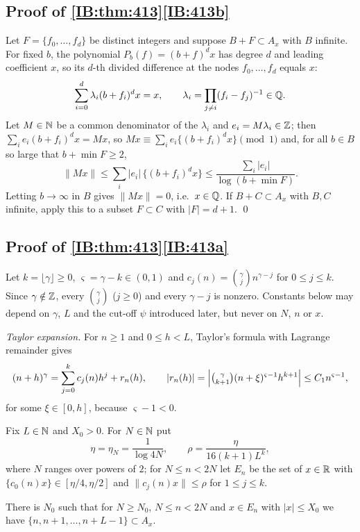 \subsection{Proof of \texorpdfstring{\cref{IB:thm:413}\ref{IB:413b}}{part (b)}}

Let $F=\{f_0,\dots,f_d\}$ be distinct integers and suppose $B+F\subset A_x$ with $B$
infinite. For fixed $b$, the polynomial $P_b(f)=(b+f)^dx$ has degree $d$ and leading
coefficient $x$, so its $d$-th divided difference at the nodes $f_0,\dots,f_d$ equals
$x$:
\[
\sum_{i=0}^d\lambda_i(b+f_i)^dx=x,\qquad \lambda_i=\prod_{j\ne i}(f_i-f_j)^{-1}\in\mathbb{Q} .
\]
Let $M\in\mathbb{N}$ be a common denominator of the $\lambda_i$ and $e_i=M\lambda_i\in\mathbb{Z}$; then
$\sum_ie_i(b+f_i)^dx=Mx$, so $Mx\equiv\sum_ie_i\{(b+f_i)^dx\}\pmod 1$ and, for all
$b\in B$ so large that $b+\min F\ge2$,
\[
\|Mx\|\le\sum_i|e_i|\,\{(b+f_i)^dx\}\le\frac{\sum_i|e_i|}{\log(b+\min F)} .
\]
Letting $b\to\infty$ in $B$ gives $\|Mx\|=0$, i.e.\ $x\in\mathbb{Q}$. If $B+C\subset A_x$ with $B,C$
infinite, apply this to a subset $F\subset C$ with $|F|=d+1$. \qed

\subsection{Proof of \texorpdfstring{\cref{IB:thm:413}\ref{IB:413a}}{part (a)}}

Let $k=\lfloor\gamma\rfloor\ge0$, $\varsigma=\gamma-k\in(0,1)$ and
$c_j(n)=\binom{\gamma}{j}n^{\gamma-j}$ for $0\le j\le k$. Since $\gamma\notin\mathbb{Z}$, every
$\binom\gamma j$ ($j\ge0$) and every $\gamma-j$ is nonzero. Constants below may depend on
$\gamma$, $L$ and the cut-off $\psi$ introduced later, but never on $N$, $n$ or $x$.

\emph{Taylor expansion.} For $n\ge1$ and $0\le h<L$, Taylor's formula with
Lagrange remainder gives
\begin{equation}\label{IB:eq:taylor}
(n+h)^\gamma=\sum_{j=0}^kc_j(n)h^j+r_n(h),\qquad
|r_n(h)|=\Bigl|\tbinom{\gamma}{k+1}(n+\xi)^{\varsigma-1}h^{k+1}\Bigr|\le C_1n^{\varsigma-1},
\end{equation}
for some $\xi\in[0,h]$, because $\varsigma-1<0$.

Fix $L\in\mathbb{N}$ and $X_0>0$. For $N\in\mathbb{N}$ put
\[
\eta=\eta_N=\frac1{\log 4N},\qquad \rho=\frac{\eta}{16(k+1)L^k},
\]
where $N$ ranges over powers of $2$; for $N\le n<2N$ let $E_n$ be the set of $x\in\mathbb{R}$ with
$\{c_0(n)x\}\in[\eta/4,\eta/2]$ and $\|c_j(n)x\|\le\rho$ for $1\le j\le k$.

\begin{lemma}
\label{IB:lem:En}
There is $N_0$ such that for $N\ge N_0$, $N\le n<2N$ and $x\in E_n$ with $|x|\le X_0$ we
have $\{n,n+1,\dots,n+L-1\}\subset A_x$.
\end{lemma}

